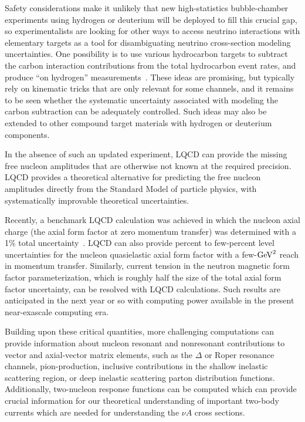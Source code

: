 Safety considerations make it unlikely that new high-statistics bubble-chamber experiments using
hydrogen or deuterium will be deployed to fill this crucial gap,
so experimentalists are looking for other ways to access neutrino interactions
with elementary targets as a tool for disambiguating neutrino cross-section modeling uncertainties.
One possibility is to use various hydrocarbon targets to subtract the carbon interaction contributions from
the total hydrocarbon event rates, and produce ``on hydrogen'' measurements~\cite{PhysRevD.92.051302, PhysRevD.101.092003, Hamacher-Baumann:2020ogq, DUNE:2021tad}.
These ideas are promising, but typically rely on kinematic tricks that are only relevant for some channels, and it remains to be seen whether the systematic uncertainty associated with modeling the carbon subtraction can be adequately controlled. Such ideas may also be extended to other compound target materials with hydrogen or deuterium components.

In the absence of such an updated experiment,
LQCD can provide the missing free nucleon amplitudes
that are otherwise not known at the required precision.
LQCD provides a theoretical alternative for predicting the free nucleon amplitudes directly from the Standard Model of particle physics, with systematically improvable theoretical uncertainties.%
\begin{marginnote}
\end{marginnote}%
Recently, a benchmark LQCD calculation was achieved in which the nucleon axial charge (the axial form factor at zero momentum transfer) was determined with a 1\% total uncertainty~\cite{Chang:2018uxx}.
LQCD can also provide percent to few-percent level uncertainties for the nucleon quasielastic axial form factor with a few-${\rm GeV}^2$ reach in momentum transfer.
Similarly, current tension in the neutron magnetic form factor parameterization, which is roughly half the size of the total axial form factor uncertainty, can be resolved with LQCD calculations.
Such results are anticipated in the next year or so with computing power available in the present near-exascale computing era.

Building upon these critical quantities, more challenging computations can provide information about nucleon
resonant and nonresonant contributions to vector and axial-vector matrix elements,
such as the $\Delta$ or Roper resonance channels, pion-production,
inclusive contributions in the shallow inelastic scattering region,
or deep inelastic scattering parton distribution functions.
Additionally, two-nucleon response functions can be computed which can provide crucial information for our theoretical understanding of important two-body currents which are needed for understanding the $\nu A$ cross sections.


